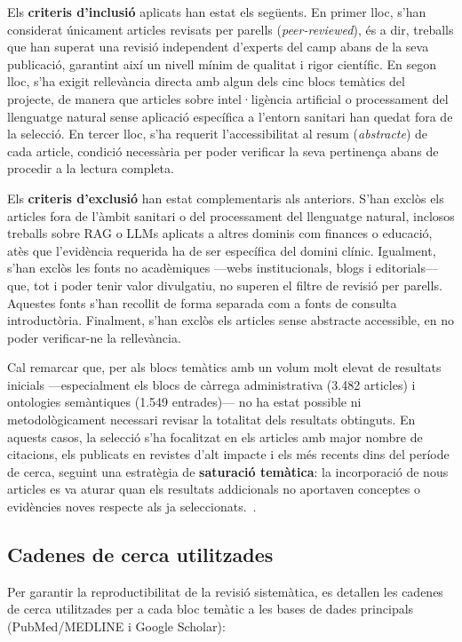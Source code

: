 \documentclass[CAT]{TFUOC}%
\begin{document}
Els \textbf{criteris d'inclusió} aplicats han estat els següents. En primer lloc, s'han considerat únicament articles revisats per parells (\textit{peer-reviewed}), és a dir, treballs que han superat una revisió independent d'experts del camp abans de la seva publicació, garantint així un nivell mínim de qualitat i rigor científic. En segon lloc, s'ha exigit rellevància directa amb algun dels cinc blocs temàtics del projecte, de manera que articles sobre intel·ligència artificial o processament del llenguatge natural sense aplicació específica a l'entorn sanitari han quedat fora de la selecció. En tercer lloc, s'ha requerit l'accessibilitat al resum (\textit{abstracte}) de cada article, condició necessària per poder verificar la seva pertinença abans de procedir a la lectura completa.

Els \textbf{criteris d'exclusió} han estat complementaris als anteriors. S'han exclòs els articles fora de l'àmbit sanitari o del processament del llenguatge natural, inclosos treballs sobre RAG o LLMs aplicats a altres dominis com finances o educació, atès que l'evidència requerida ha de ser específica del domini clínic. Igualment, s'han exclòs les fonts no acadèmiques ---webs institucionals, blogs i editorials--- que, tot i poder tenir valor divulgatiu, no superen el filtre de revisió per parells. Aquestes fonts s'han recollit de forma separada com a fonts de consulta introductòria. Finalment, s'han exclòs els articles sense abstracte accessible, en no poder verificar-ne la rellevància.

Cal remarcar que, per als blocs temàtics amb un volum molt elevat de resultats inicials ---especialment els blocs de càrrega administrativa (3.482 articles) i ontologies semàntiques (1.549 entrades)--- no ha estat possible ni metodològicament necessari revisar la totalitat dels resultats obtinguts. En aquests casos, la selecció s'ha focalitzat en els articles amb major nombre de citacions, els publicats en revistes d'alt impacte i els més recents dins del període de cerca, seguint una estratègia de \textbf{saturació temàtica}: la incorporació de nous articles es va aturar quan els resultats addicionals no aportaven conceptes o evidències noves respecte als ja seleccionats.~\cite{page2021prisma}.

\subsection{Cadenes de cerca utilitzades}

Per garantir la reproductibilitat de la revisió sistemàtica, es detallen les cadenes de cerca utilitzades per a cada bloc temàtic a les bases de dades principals (PubMed/MEDLINE i Google Scholar):
\end{document}
